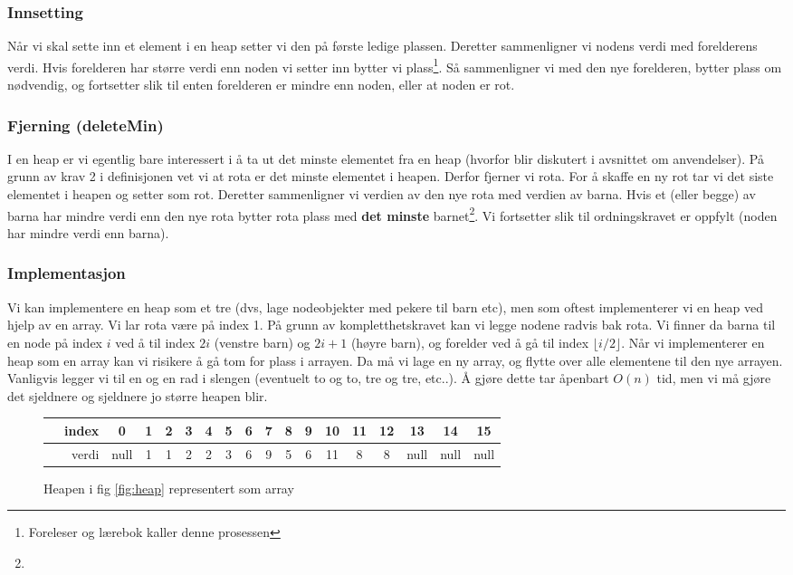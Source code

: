 \subsubsection{Innsetting}
Når vi skal sette inn et element i en heap setter vi den på første ledige plassen. Deretter sammenligner vi nodens verdi med forelderens verdi. Hvis forelderen har større verdi enn noden vi setter inn bytter vi plass\footnote{Foreleser og lærebok kaller denne prosessen }. Så sammenligner vi med den nye forelderen, bytter plass om nødvendig, og fortsetter slik til enten forelderen er mindre enn noden, eller at noden er rot. 


\subsubsection{Fjerning (deleteMin)}
I en heap er vi egentlig bare interessert i å ta ut det minste elementet fra en heap (hvorfor blir diskutert i avsnittet om anvendelser). På grunn av krav 2 i definisjonen vet vi at rota er det minste elementet i heapen. Derfor fjerner vi rota. For å skaffe en ny rot tar vi det siste elementet i heapen og setter som rot. Deretter sammenligner vi verdien av den nye rota med verdien av barna. Hvis et (eller begge) av barna har mindre verdi enn den nye rota bytter rota plass med \textbf{det minste} barnet\footnote{}. Vi fortsetter slik til ordningskravet er oppfylt (noden har mindre verdi enn barna). 


\subsubsection{Implementasjon}
Vi kan implementere en heap som et tre (dvs, lage nodeobjekter med pekere til barn etc), men som oftest implementerer vi en heap ved hjelp av en array. Vi lar rota være på index 1. På grunn av kompletthetskravet kan vi legge nodene radvis bak rota. Vi finner da barna til en node på index $ i $ ved å til index $ 2i $ (venstre barn) og $ 2i+1 $ (høyre barn), og forelder ved å gå til index $ \lfloor i/2 \rfloor $. Når vi implementerer en heap som en array kan vi risikere å gå tom for plass i arrayen. Da må vi lage en ny array, og flytte over alle elementene til den nye arrayen. Vanligvis legger vi til en og en rad i slengen (eventuelt to og to, tre og tre, etc..). Å gjøre dette tar åpenbart $ O(n) $ tid, men vi må gjøre det sjeldnere og sjeldnere jo større heapen blir. 

\begin{figure}[H]
\centering
\caption{Heapen i fig \ref{fig:heap} representert som array}
\begin{tabular}{r||c|c|c|c|c|c|c|c|c|c|c|c|c|c|c|c}
	~~index &  0   & 1 & 2 & 3 & 4 & 5 & 6 & 7 & 8 & 9 & 10 & 11 & 12 &  13  &  14  &  15  \\ \hline
	~~verdi & null & 1 & 1 & 2 & 2 & 3 & 6 & 9 & 5 & 6 & 11 & 8  & 8  & null & null & null 
\end{tabular}
\end{figure}

